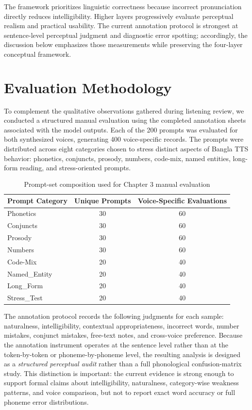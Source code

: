 The framework prioritizes linguistic correctness because incorrect pronunciation directly reduces intelligibility. Higher layers progressively evaluate perceptual realism and practical usability. The current annotation protocol is strongest at sentence-level perceptual judgment and diagnostic error spotting; accordingly, the discussion below emphasizes those measurements while preserving the four-layer conceptual framework.

\section{Evaluation Methodology}

To complement the qualitative observations gathered during listening review, we conducted a structured manual evaluation using the completed annotation sheets associated with the model outputs. Each of the 200 prompts was evaluated for both synthesized voices, generating 400 voice-specific records. The prompts were distributed across eight categories chosen to stress distinct aspects of Bangla TTS behavior: phonetics, conjuncts, prosody, numbers, code-mix, named entities, long-form reading, and stress-oriented prompts.

\begin{table}[htbp]
\centering
\begin{tabular}{l c c}
\toprule
Prompt Category & Unique Prompts & Voice-Specific Evaluations \\
\midrule
Phonetics & 30 & 60 \\
Conjuncts & 30 & 60 \\
Prosody & 30 & 60 \\
Numbers & 30 & 60 \\
Code-Mix & 20 & 40 \\
Named\_Entity & 20 & 40 \\
Long\_Form & 20 & 40 \\
Stress\_Test & 20 & 40 \\
\bottomrule
\end{tabular}
\caption{Prompt-set composition used for Chapter 3 manual evaluation}
\label{tab:core_system_prompt_profile}
\end{table}

The annotation protocol records the following judgments for each sample: naturalness, intelligibility, contextual appropriateness, incorrect words, number mistakes, conjunct mistakes, free-text notes, and cross-voice preference. Because the annotation instrument operates at the sentence level rather than at the token-by-token or phoneme-by-phoneme level, the resulting analysis is designed as a \textit{structured perceptual audit} rather than a full phonological confusion-matrix study. This distinction is important: the current evidence is strong enough to support formal claims about intelligibility, naturalness, category-wise weakness patterns, and voice comparison, but not to report exact word accuracy or full phoneme error distributions.

